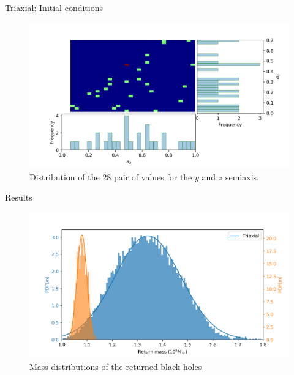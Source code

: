 \documentclass[handout]{beamer}
\begin{document}
\begin{frame}{Triaxial: Initial conditions}
	\begin{figure}[h]
		\centering
		\includegraphics[width = 0.9\linewidth]{"../Files/Week 13/triaxial_axes"}
		\caption{Distribution of the 28 pair of values for the $y$ and $z$ semiaxis.}
		\label{fig: semiaxisDist}
	\end{figure}
\end{frame}

\begin{frame}{Results}
	\begin{figure}[h]
		\centering
		\includegraphics[width=\linewidth]{"../Files/Week 14/dist_masses"}
		\caption{Mass distributions of the returned black holes}
		\label{fig: massDist}
	\end{figure}
\end{frame}
\end{document}
